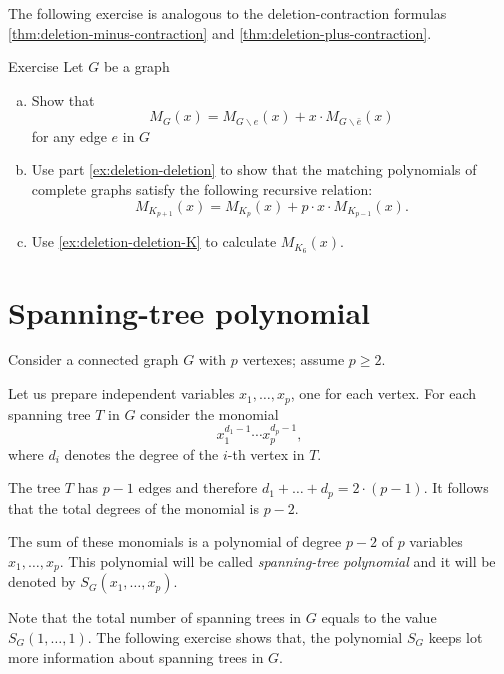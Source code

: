 The following exercise is analogous to the deletion-contraction formulas \ref{thm:deletion-minus-contraction} and \ref{thm:deletion-plus-contraction}.

\begin{thm}{Exercise}\label{ex:deletion-deletion-total}
Let $G$ be a graph
\begin{enumerate}[(a)]
\item\label{ex:deletion-deletion} Show that
\[M_G(x)=M_{G\backslash e}(x)+x\cdot M_{G\backslash \bar e}(x)\]
for any edge $e$ in $G$

\item\label{ex:deletion-deletion-K} Use part \ref{ex:deletion-deletion} to show that the matching polynomials of complete graphs satisfy the following recursive relation:
\[M_{K_{p+1}}(x)=M_{K_{p}}(x)+p\cdot x\cdot M_{K_{p-1}}(x).\]

\item Use \ref{ex:deletion-deletion-K} to calculate $M_{K_6}(x)$. 
\end{enumerate}

\end{thm}

\section*{Spanning-tree polynomial}

Consider a connected graph $G$ with $p$ vertexes;
assume $p\ge 2$.

Let us prepare independent variables $x_1,\dots,x_p$, one for each vertex.
For each spanning tree $T$ in $G$ consider the monomial 
\[x_1^{d_1-1}\cdots x_p^{d_p-1},\]
where $d_i$ denotes the degree of the $i$-th vertex in $T$.

The tree $T$ has $p-1$ edges and therefore 
$d_1+\dots+d_p=2\cdot(p-1)$.
It follows that the total degrees of the monomial is $p-2$.

The sum of these monomials is a polynomial of degree $p-2$ of $p$ variables $x_1,\dots, x_p$.
This polynomial will be called \emph{spanning-tree polynomial} and it will be denoted by 
$S_G(x_1,\dots,x_p)$.

Note that the total number of spanning trees in $G$ equals to the value
$S_G(1,\dots,1)$.
The following exercise shows that,
the polynomial $S_G$ keeps lot more information about spanning trees in $G$.


